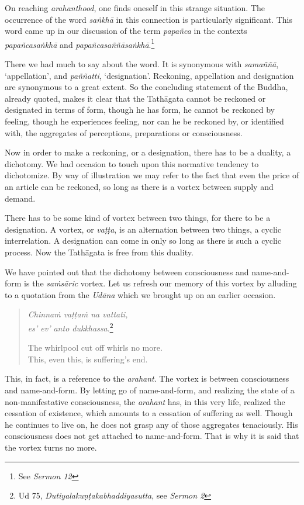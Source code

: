On reaching \emph{arahanthood}, one finds oneself in this strange situation. The occurrence of the word \emph{saṅkhā} in this connection is particularly significant. This word came up in our discussion of the term \emph{papañca} in the contexts \emph{papañcasaṅkhā} and \emph{papañcasaññāsaṅkhā}.\footnote{See \emph{Sermon 12}}

There we had much to say about the word. It is synonymous with \emph{samaññā}, `appellation', and \emph{paññatti}, `designation'. Reckoning, appellation and designation are synonymous to a great extent. So the concluding statement of the Buddha, already quoted, makes it clear that the Tathāgata cannot be reckoned or designated in terms of form, though he has form, he cannot be reckoned by feeling, though he experiences feeling, nor can he be reckoned by, or identified with, the aggregates of perceptions, preparations or consciousness.

Now in order to make a reckoning, or a designation, there has to be a duality, a dichotomy. We had occasion to touch upon this normative tendency to dichotomize. By way of illustration we may refer to the fact that even the price of an article can be reckoned, so long as there is a vortex between supply and demand.

There has to be some kind of vortex between two things, for there to be a designation. A vortex, or \emph{vaṭṭa}, is an alternation between two things, a cyclic interrelation. A designation can come in only so long as there is such a cyclic process. Now the Tathāgata is free from this duality.

We have pointed out that the dichotomy between consciousness and name-and-form is the \emph{saṁsāric} vortex. Let us refresh our memory of this vortex by alluding to a quotation from the \emph{Udāna} which we brought up on an earlier occasion.

\begin{quote}
\emph{Chinnaṁ vaṭṭaṁ na vattati,}\\
\emph{es' ev' anto dukkhassa}.\footnote{Ud 75, \emph{Dutiyalakuṇṭakabhaddiyasutta}, see \emph{Sermon 2}}

The whirlpool cut off whirls no more.\\
This, even this, is suffering's end.
\end{quote}

This, in fact, is a reference to the \emph{arahant}. The vortex is between consciousness and name-and-form. By letting go of name-and-form, and realizing the state of a non-manifestative consciousness, the \emph{arahant} has, in this very life, realized the cessation of existence, which amounts to a cessation of suffering as well. Though he continues to live on, he does not grasp any of those aggregates tenaciously. His consciousness does not get attached to name-and-form. That is why it is said that the vortex turns no more.

